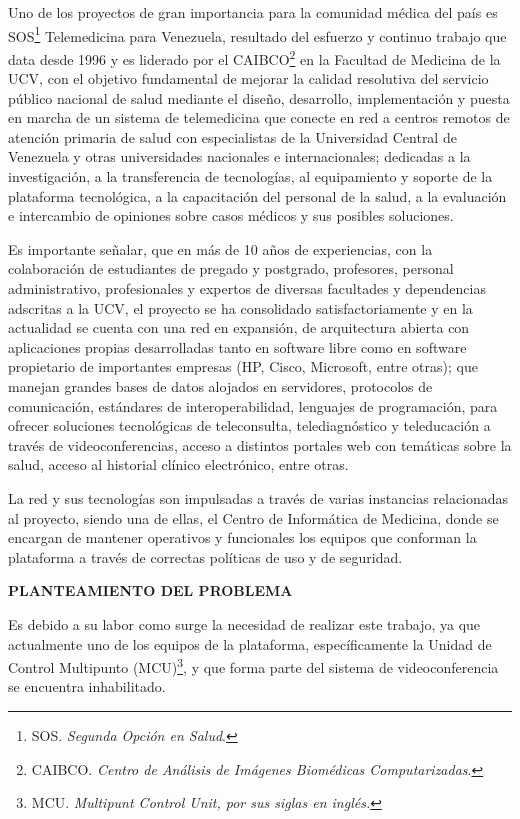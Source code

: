 \documentclass[12pt,letterpaper]{article}
\begin{document}
Uno de los proyectos de gran importancia para la comunidad médica del país es SOS\footnote{SOS. \emph{Segunda Opción en Salud}.} Telemedicina para Venezuela, resultado del esfuerzo y continuo trabajo que data desde 1996 y es liderado por el CAIBCO\footnote{CAIBCO. \emph{Centro de Análisis de Imágenes Biomédicas Computarizadas}.} en la Facultad de Medicina de la UCV, con el objetivo fundamental de mejorar la calidad resolutiva del servicio público nacional de salud mediante el diseño, desarrollo, implementación y puesta en marcha de un sistema de telemedicina que conecte en red a centros remotos de atención primaria de salud con especialistas de la Universidad Central de Venezuela y otras universidades nacionales e internacionales; dedicadas a la investigación, a la transferencia de tecnologías, al equipamiento y soporte de la plataforma tecnológica, a la capacitación del personal de la salud, a la evaluación e intercambio de opiniones sobre casos médicos y sus posibles soluciones. 

Es importante señalar, que en más de 10 años de experiencias, con la colaboración de estudiantes de pregado y postgrado, profesores, personal administrativo, profesionales y expertos de diversas facultades y dependencias adscritas a la UCV, el proyecto se ha consolidado satisfactoriamente y en la actualidad se cuenta con una red en expansión, de arquitectura abierta con aplicaciones propias desarrolladas tanto en software libre como en software propietario de importantes empresas (HP, Cisco, Microsoft, entre otras); que manejan grandes bases de datos alojados en servidores, protocolos de comunicación, estándares de interoperabilidad, lenguajes de programación, para ofrecer soluciones tecnológicas de teleconsulta, telediagnóstico y teleducación a través de videoconferencias, acceso a distintos portales web con temáticas sobre la salud, acceso al historial clínico electrónico, entre otras. 

La red y sus tecnologías son impulsadas a través de varias instancias relacionadas al proyecto, siendo una de ellas, el Centro de Informática de Medicina, donde se encargan de mantener operativos y funcionales los equipos que conforman la plataforma a través de correctas políticas de uso y de seguridad. 
   
\centerline{\textbf{PLANTEAMIENTO DEL PROBLEMA}}


Es debido a su labor como surge la necesidad de realizar este trabajo, ya que actualmente uno de los equipos de la plataforma, específicamente la Unidad de Control Multipunto (MCU)\footnote{MCU. \emph{Multipunt Control Unit, por sus siglas en inglés.}}, y que forma parte del sistema de videoconferencia se encuentra inhabilitado.
\end{document}
